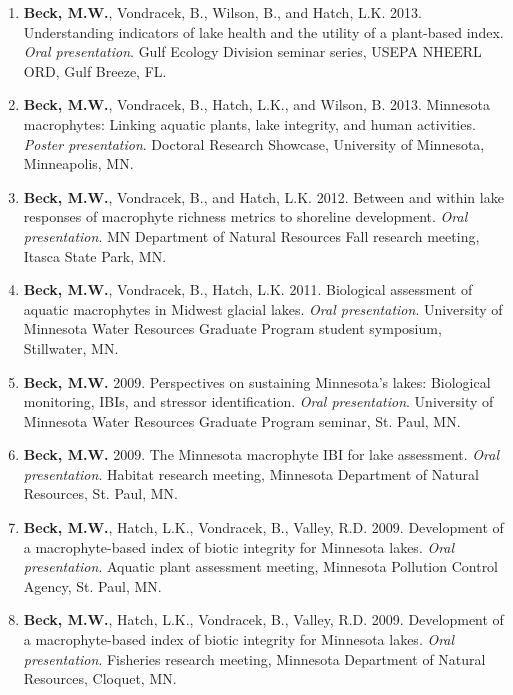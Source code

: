 \documentclass[letterpaper,12pt]{article}
\begin{document}
\begin{enumerate}
\item {\bf Beck, M.W.}, Vondracek, B., Wilson, B., and Hatch, L.K. 2013. Understanding indicators of lake health and the utility of a plant-based index. \textit{Oral presentation}. Gulf Ecology Division seminar series, USEPA NHEERL ORD, Gulf Breeze, FL.

\item {\bf Beck, M.W.}, Vondracek, B., Hatch, L.K., and Wilson, B. 2013. Minnesota macrophytes: Linking aquatic plants, lake integrity, and human activities. \textit{Poster presentation}. Doctoral Research Showcase, University of Minnesota, Minneapolis, MN.

\item {\bf Beck, M.W.}, Vondracek, B., and Hatch, L.K. 2012. Between and within lake responses of macrophyte richness metrics to shoreline development. \textit{Oral presentation}. MN Department of Natural Resources Fall research meeting, Itasca State Park, MN.

\item {\bf Beck, M.W.}, Vondracek, B., Hatch, L.K. 2011. Biological assessment of aquatic macrophytes in Midwest glacial lakes. \textit{Oral presentation}. University of Minnesota Water Resources Graduate Program student symposium, Stillwater, MN.

\item {\bf Beck, M.W.} 2009. Perspectives on sustaining Minnesota's lakes: Biological monitoring, IBIs, and stressor identification. \textit{Oral presentation}. University of Minnesota Water Resources Graduate Program seminar, St. Paul, MN.

\item {\bf Beck, M.W.} 2009. The Minnesota macrophyte IBI for lake assessment. \textit{Oral presentation}. Habitat research meeting, Minnesota Department of Natural Resources, St. Paul, MN.

\item {\bf Beck, M.W.}, Hatch, L.K., Vondracek, B., Valley, R.D. 2009. Development of a macrophyte-based index of biotic integrity for Minnesota lakes. \textit{Oral presentation}. Aquatic plant assessment meeting, Minnesota Pollution Control Agency, St. Paul, MN.

\item {\bf Beck, M.W.}, Hatch, L.K., Vondracek, B., Valley, R.D. 2009. Development of a macrophyte-based index of biotic integrity for Minnesota lakes. \textit{Oral presentation}. Fisheries research meeting, Minnesota Department of Natural Resources, Cloquet, MN.

\end{enumerate}
\end{document}
